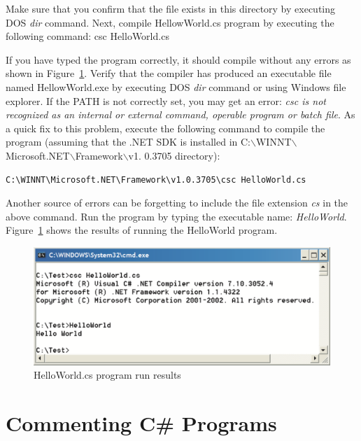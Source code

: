 Make sure that you confirm that the file exists in this directory
by executing DOS \emph{dir} command. Next, compile HellowWorld.cs
program by executing the following command: csc HelloWorld.cs

If you have typed the program correctly, it should compile without
any errors as shown in Figure~\ref{fig:HelloWorldOut}. Verify that
the compiler has produced an executable file named HellowWorld.exe
by executing DOS \emph{dir} command or using Windows file
explorer. If the PATH is not correctly set, you may get an error:
\emph{csc is not recognized as an internal or external command,
operable program or batch file}. As a quick fix to this problem,
execute the following command to compile the program (assuming
that the .NET SDK is installed in
C:$\backslash$WINNT$\backslash$Microsoft.NET$\backslash$Framework$\backslash$v1.
0.3705 directory):
\begin{verbatim}
C:\WINNT\Microsoft.NET\Framework\v1.0.3705\csc HelloWorld.cs
\end{verbatim}
Another source of errors can be forgetting to include the file
extension \emph{cs} in the above command. Run the program by
typing the executable name: \emph{HelloWorld}.
Figure~\ref{fig:HelloWorldOut} shows the results of running the
HelloWorld program.




\begin{figure}
\centering
\includegraphics[scale=0.45]{./CSharpBasics/Illus/HelloWorldOut}
\caption{HelloWorld.cs program run results}
\label{fig:HelloWorldOut}
\end{figure}


{\samepage\vspace{1ex}\noindent\usebox{\phicsep}\vspace{1.5ex}}
\vspace{-0.4in}
\section{Commenting C\# Programs} \label{sec:Comments}



